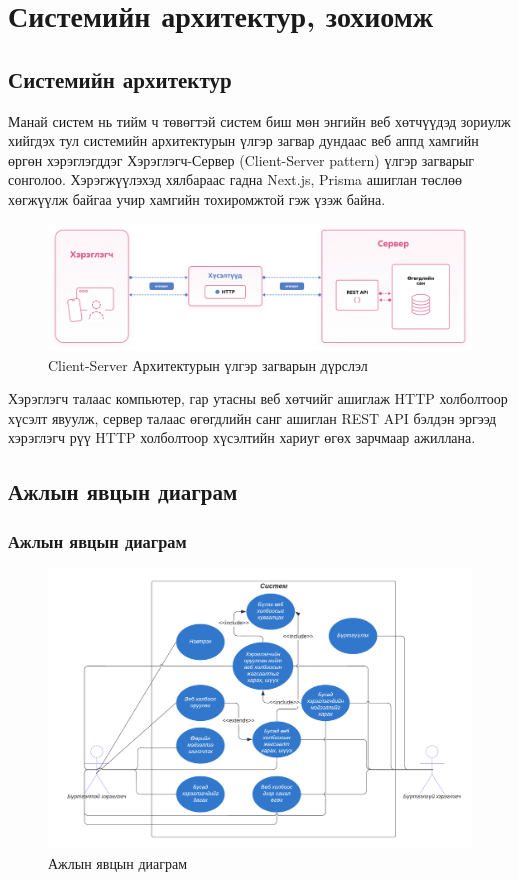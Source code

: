 \chapter{Системийн архитектур, зохиомж}

\section{Системийн архитектур}

Манай систем нь тийм ч төвөгтэй систем биш мөн энгийн веб хөтчүүдэд зориулж хийгдэх тул системийн архитектурын үлгэр загвар дундаас веб аппд хамгийн өргөн хэрэглэгддэг Хэрэглэгч-Сервер (Client-Server pattern) үлгэр загварыг сонголоо. Хэрэгжүүлэхэд хялбараас гадна Next.js, Prisma ашиглан төслөө хөгжүүлж байгаа учир хамгийн тохиромжтой гэж үзэж байна.

\begin{figure}[h]
	\centering
	\includegraphics[width=15cm]{images/architecture.png}
	\caption{Client-Server Архитектурын үлгэр загварын дүрслэл}
	\label{fig:architecture}
\end{figure}

Хэрэглэгч талаас компьютер, гар утасны веб хөтчийг ашиглаж HTTP холболтоор хүсэлт явуулж, сервер талаас өгөгдлийн санг ашиглан REST API бэлдэн эргээд хэрэглэгч рүү HTTP холболтоор хүсэлтийн хариуг өгөх зарчмаар ажиллана.

\pagebreak
\section{Ажлын явцын диаграм}

\subsection{Ажлын явцын диаграм}
\begin{figure}[h]
	\centering
	\includegraphics[width=15cm]{images/usecase.png}
	\caption{Ажлын явцын диаграм}
	\label{fig:usecase}
\end{figure}

